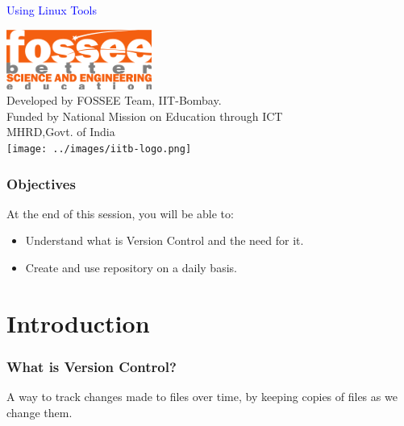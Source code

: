 \documentclass[14pt,compress]{beamer}
\begin{document}
\begin{frame}

\begin{center}
\vspace{12pt}
\textcolor{blue}{\huge Using Linux Tools}
\end{center}
\vspace{18pt}
\begin{center}
\vspace{10pt}
\includegraphics[scale=0.95]{../images/fossee-logo.png}\\
\vspace{5pt}
\scriptsize Developed by FOSSEE Team, IIT-Bombay. \\ 
\scriptsize Funded by National Mission on Education through ICT\\
\scriptsize  MHRD,Govt. of India\\
\texttt{[image: ../images/iitb-logo.png]}\\
\end{center}
\end{frame}

\begin{frame}
  \frametitle{Objectives}
  At the end of this session, you will be able to:
  \begin{itemize}
  \item Understand what is Version Control and the need for it.
  \item Create and use repository on a daily basis.
  \end{itemize}
\end{frame}


\section{Introduction}

\begin{frame}
  \frametitle{What is Version Control?}
  \begin{block}{}
    A way to track changes made to files over time, by keeping copies
    of files as we change them.
  \end{block}
\end{frame}
\end{document}
